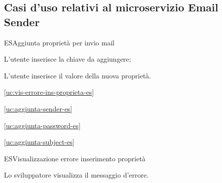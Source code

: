 \subsection{Casi d'uso relativi al microservizio Email Sender}

\begin{usecase}{1}{ES}{Aggiunta proprietà per invio mail}



	\begin{ucscenarioprincipale}
		\item L'utente inserisce la chiave da aggiungere;
		\item L'utente inserisce il valore della nuova proprietà.
	\end{ucscenarioprincipale}


	\begin{ucestensioni}
		\item \ref{uc:vis-errore-ins-proprieta-es}
	\end{ucestensioni}

	\begin{ucgeneralizzazioni}
		\item \ref{uc:aggiunta-sender-es}
		\item \ref{uc:aggiunta-password-es}
		\item \ref{uc:aggiunta-subject-es}
	\end{ucgeneralizzazioni}

	\label{uc:aggiunta-proprieta-es}
\end{usecase}

\begin{usecase}{2}{ES}{Visualizzazione errore inserimento proprietà}



	\begin{ucscenarioprincipale}
		\item Lo sviluppatore visualizza il messaggio d'errore.
	\end{ucscenarioprincipale}


	\label{uc:vis-errore-ins-proprieta-es}
\end{usecase}


